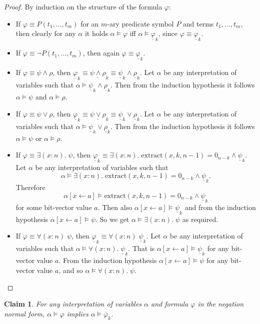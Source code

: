 \documentclass[a4paper]{article}
\newtheorem{claim}{Claim}
\begin{document}
\begin{proof}
  By induction on the structure of the formula $\varphi$:
  \begin{itemize}
    \item If $\varphi \equiv P(t_1, \dots, t_m)$ for an $m$-ary predicate symbol $P$ and terms $t_1, \dots, t_m$, then clearly for any $\alpha$ it holds $\alpha \models \varphi$ iff $\alpha \models \underline{\varphi}_k$, since $\varphi \equiv \underline{\varphi}_k$.
    \item If $\varphi \equiv \neg P(t_1, \dots, t_m)$, then again $\varphi \equiv \underline{\varphi}_k$.
    \item If $\varphi \equiv \psi \wedge \rho$, then $\underline{\varphi}_k \equiv \underline{\psi \wedge \rho}_k \equiv \underline{\psi}_k \wedge \underline{\rho}_k$. Let $\alpha$ be any interpretation of variables such that $\alpha \models \underline{\psi}_k \wedge \underline{\rho}_k$. Then from the induction hypothesis it follows $\alpha \models \psi$ and $\alpha \models \rho$.
    \item If $\varphi \equiv \psi \vee \rho$, then $\underline{\varphi}_k \equiv \underline{\psi \vee \rho}_k \equiv \underline{\psi}_k \vee \underline{\rho}_k$. Let $\alpha$ be any interpretation of variables such that $\alpha \models \underline{\psi}_k \vee \underline{\rho}_k$. Then from the induction hypothesis it follows $\alpha \models \psi$ or $\alpha \models \rho$.
    \item If $\varphi \equiv \exists (x : n) . \; \psi$, then $\underline{\varphi}_k \equiv \exists (x : n) . \; \mathrm{extract}(x, k, n-1) = 0_{n-k} \wedge \underline{\psi}_k$. Let $\alpha$ be any interpretation of variables such that 
      \[ 
          \alpha \models \exists (x : n) . \; \mathrm{extract}(x, k, n-1) = 0_{n-k} \wedge \underline{\psi}_k. 
      \]
      Therefore 
      \[ 
         \alpha[x \leftarrow a] \models \mathrm{extract}(x, k, n-1) = 0_{n-k} \wedge \underline{\psi}_k
      \] 
      for some bit-vector value $a$. Then also $\alpha[x \leftarrow a] \models \underline{\psi}_k$ and from the induction hypothesis $\alpha[x \leftarrow a] \models \psi$. So we get $\alpha \models \exists (x : n). \; \psi$ as required.
    \item If $\varphi \equiv \forall (x : n) \; \psi$, then $\underline{\varphi}_k \equiv \forall (x : n) \; \underline{\psi}_k$. Let $\alpha$ be any interpretation of variables such that $\alpha \models  \forall (x : n) . \; \underline{\psi}_k$. That is $\alpha[x \leftarrow a] \models \underline{\psi}_k$ for any bit-vector value $a$. From the induction hypothesis $\alpha[x \leftarrow a] \models \psi$ for any bit-vector value $a$, and so $\alpha \models \forall (x : n) . \; \psi$.
  \end{itemize}  
\end{proof}

\begin{claim}
  For any interpretation of variables $\alpha$ and formula $\varphi$ in the negation normal form, $\alpha \models \varphi$ implies $\alpha \models \overline{\varphi}_k$.
\end{claim}
\end{document}
